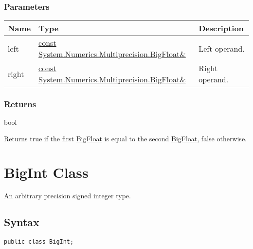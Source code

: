 \documentclass[a4paper,oneside,11.000000pt]{book}
\begin{document}
\subsubsection*{Parameters}
\begin{flushleft}
\begin{supertabular}[l]{!{\raggedright}p{1.30721cm}!{\raggedright}p{8.55945cm}!{\raggedright}p{3.66839cm}}
\textbf{Name}
& \textbf{Type}
& \textbf{Description}
\\
\hline
left
& \hyperlink{System.Numerics.Multiprecision.BigFloat}{const System.\-Numerics.\-Multiprecision.\-BigFloat\&\-}
& Left operand.

\\
right
& \hyperlink{System.Numerics.Multiprecision.BigFloat}{const System.\-Numerics.\-Multiprecision.\-BigFloat\&\-}
& Right operand.

\\
\end{supertabular}

\end{flushleft}
\subsubsection*{Returns}bool
\begin{flushleft}
Returns true if the first \hyperlink{System.Numerics.Multiprecision.BigFloat}{BigFloat} is equal to the second \hyperlink{System.Numerics.Multiprecision.BigFloat}{BigFloat}, false otherwise.

\end{flushleft}
\clearpage
\clearpage

\hypertarget{System.Numerics.Multiprecision.BigInt}{\section{BigInt Class}}\begin{flushleft}
An arbitrary precision signed integer type.

\end{flushleft}

\subsection*{Syntax}\texttt{public class BigInt;}
\end{document}
